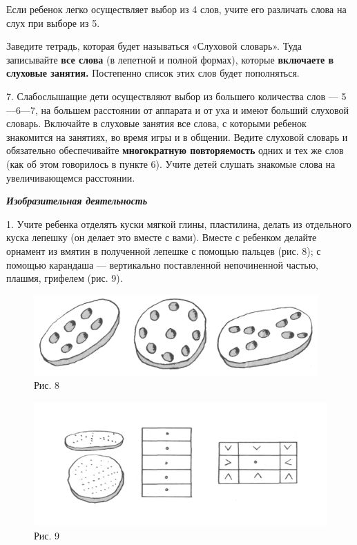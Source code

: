 \documentclass{book}
\renewcommand{\emph}[1]{\textit{#1}}
\begin{document}
Если ребенок легко осуществляет выбор из 4 слов, учите его различать
слова на слух при выборе из 5.

Заведите тетрадь, которая будет называться «Слуховой словарь». Туда
записывайте \textbf{все слова} (в лепетной и полной формах), которые
\textbf{включаете в слуховые занятия.} Постепенно список этих слов будет
пополняться.

7. Слабослышащие дети осуществляют выбор из большего количества слов ---
5---6---7, на большем расстоянии от аппарата и от уха и имеют больший
слуховой словарь. Включайте в слуховые занятия все слова, с которыми
ребенок знакомится на занятиях, во время игры и в общении. Ведите
слуховой словарь и обязательно обеспечивайте \textbf{многократную
повторяемость} одних и тех же слов (как об этом говорилось в пункте 6).
Учите детей слушать знакомые слова на увеличивающемся расстоянии.

\emph{\textbf{Изобразительная деятельность}}

1. Учите ребенка отделять куски мягкой глины, пластилина, делать из
отдельного куска лепешку (он делает это вместе с вами). Вместе с
ребенком делайте орнамент из вмятин в полученной лепешке с помощью
пальцев (рис. 8); с помощью карандаша --- вертикально поставленной
непочиненной частью, плашмя, грифелем (рис. 9).

\begin{figure}
\centering
\includegraphics[width=4.27986in,height=1.22014in]{media/media/image8.jpg}
\caption*{Рис. 8}
\end{figure}

\begin{figure}
\centering
\includegraphics[width=\linewidth]{media/media/image9.png}
\caption*{Рис. 9}
\end{figure}
\end{document}
